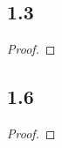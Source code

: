 \documentclass[12pt]{extarticle}
\begin{document}
\subsection*{1.3}


\begin{proof}
	
\end{proof}

\subsection*{1.6}
%
% 
%
\begin{proof}
	
\end{proof}
\end{document}
